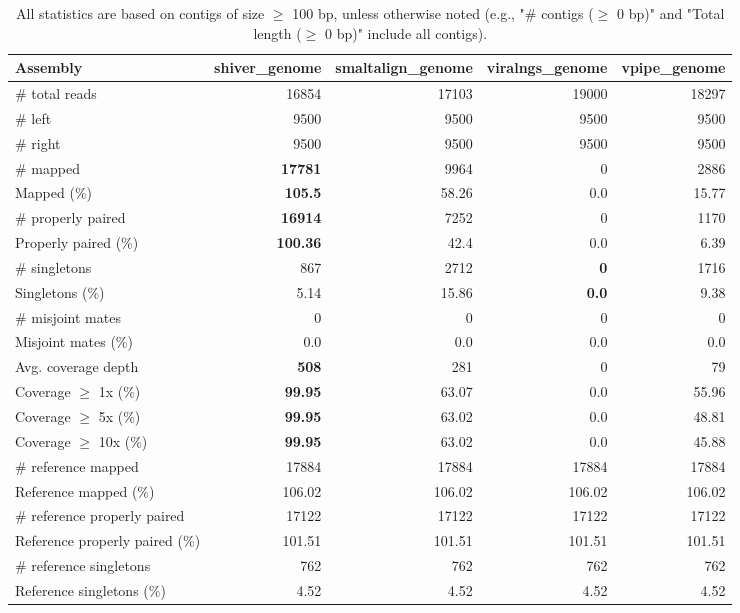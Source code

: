 \documentclass[12pt,a4paper]{article}
\begin{document}
\begin{table}[ht]
\begin{center}
\caption{All statistics are based on contigs of size $\geq$ 100 bp, unless otherwise noted (e.g., "\# contigs ($\geq$ 0 bp)" and "Total length ($\geq$ 0 bp)" include all contigs).}
\begin{tabular}{|l*{4}{|r}|}
\hline
Assembly & shiver\_genome & smaltalign\_genome & viralngs\_genome & vpipe\_genome \\ \hline
\# total reads & 16854 & 17103 & 19000 & 18297 \\ \hline
\# left & 9500 & 9500 & 9500 & 9500 \\ \hline
\# right & 9500 & 9500 & 9500 & 9500 \\ \hline
\# mapped & {\bf 17781} & 9964 & 0 & 2886 \\ \hline
Mapped (\%) & {\bf 105.5} & 58.26 & 0.0 & 15.77 \\ \hline
\# properly paired & {\bf 16914} & 7252 & 0 & 1170 \\ \hline
Properly paired (\%) & {\bf 100.36} & 42.4 & 0.0 & 6.39 \\ \hline
\# singletons & 867 & 2712 & {\bf 0} & 1716 \\ \hline
Singletons (\%) & 5.14 & 15.86 & {\bf 0.0} & 9.38 \\ \hline
\# misjoint mates & 0 & 0 & 0 & 0 \\ \hline
Misjoint mates (\%) & 0.0 & 0.0 & 0.0 & 0.0 \\ \hline
Avg. coverage depth & {\bf 508} & 281 & 0 & 79 \\ \hline
Coverage $\geq$ 1x (\%) & {\bf 99.95} & 63.07 & 0.0 & 55.96 \\ \hline
Coverage $\geq$ 5x (\%) & {\bf 99.95} & 63.02 & 0.0 & 48.81 \\ \hline
Coverage $\geq$ 10x (\%) & {\bf 99.95} & 63.02 & 0.0 & 45.88 \\ \hline
\# reference mapped & 17884 & 17884 & 17884 & 17884 \\ \hline
Reference mapped (\%) & 106.02 & 106.02 & 106.02 & 106.02 \\ \hline
\# reference properly paired & 17122 & 17122 & 17122 & 17122 \\ \hline
Reference properly paired (\%) & 101.51 & 101.51 & 101.51 & 101.51 \\ \hline
\# reference singletons & 762 & 762 & 762 & 762 \\ \hline
Reference singletons (\%) & 4.52 & 4.52 & 4.52 & 4.52 \\ \hline

\end{tabular}
\end{center}
\end{table}
\end{document}
